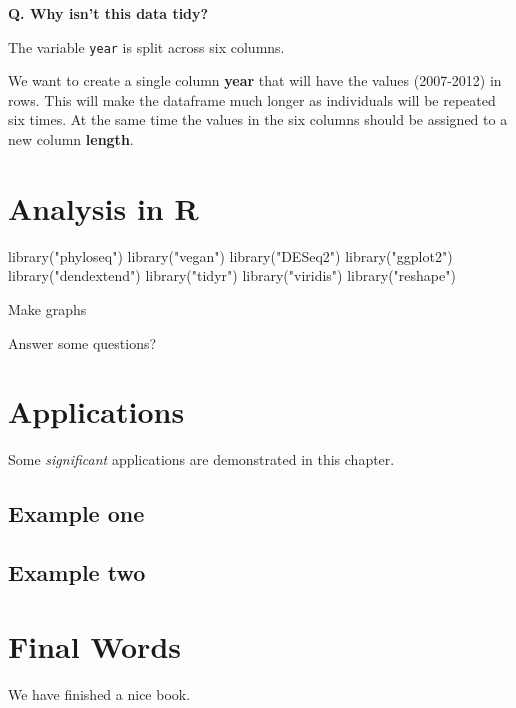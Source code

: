\documentclass[
]{book}
\newenvironment{Shaded}{\begin{snugshade}}{\end{snugshade}}
\newcommand{\FunctionTok}[1]{\textcolor[rgb]{0.00,0.00,0.00}{#1}}
\newcommand{\NormalTok}[1]{#1}
\newcommand{\StringTok}[1]{\textcolor[rgb]{0.31,0.60,0.02}{#1}}
\begin{document}
\textbf{Q. Why isn't this data tidy?}

The variable \texttt{year} is split across six columns.

We want to create a single column \textbf{year} that will have the values (2007-2012) in rows. This will make the dataframe much longer as individuals will be repeated six times. At the same time the values in the six columns should be assigned to a new column \textbf{length}.

\hypertarget{analysis-in-r}{%
\chapter{Analysis in R}\label{analysis-in-r}}

\begin{Shaded}
\begin{Highlighting}[]
\FunctionTok{library}\NormalTok{(}\StringTok{"phyloseq"}\NormalTok{)}
\FunctionTok{library}\NormalTok{(}\StringTok{"vegan"}\NormalTok{)}
\FunctionTok{library}\NormalTok{(}\StringTok{"DESeq2"}\NormalTok{)}
\FunctionTok{library}\NormalTok{(}\StringTok{"ggplot2"}\NormalTok{)}
\FunctionTok{library}\NormalTok{(}\StringTok{"dendextend"}\NormalTok{)}
\FunctionTok{library}\NormalTok{(}\StringTok{"tidyr"}\NormalTok{)}
\FunctionTok{library}\NormalTok{(}\StringTok{"viridis"}\NormalTok{)}
\FunctionTok{library}\NormalTok{(}\StringTok{"reshape"}\NormalTok{)}
\end{Highlighting}
\end{Shaded}

Make graphs

Answer some questions?

\hypertarget{applications}{%
\chapter{Applications}\label{applications}}

Some \emph{significant} applications are demonstrated in this chapter.

\hypertarget{example-one}{%
\section{Example one}\label{example-one}}

\hypertarget{example-two}{%
\section{Example two}\label{example-two}}

\hypertarget{final-words}{%
\chapter{Final Words}\label{final-words}}

We have finished a nice book.

  
\end{document}
